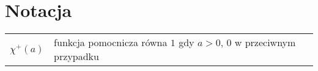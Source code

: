 \documentclass[../main.tex]{subfiles}
\begin{document}
\chapter*{Notacja}

\begin{tabularx}{\textwidth}{cl}
  $\chi^{+}(a)$ & funkcja pomocnicza równa $1$ gdy $a>0$, 0 w przeciwnym przypadku \\
\end{tabularx}
\end{document}
